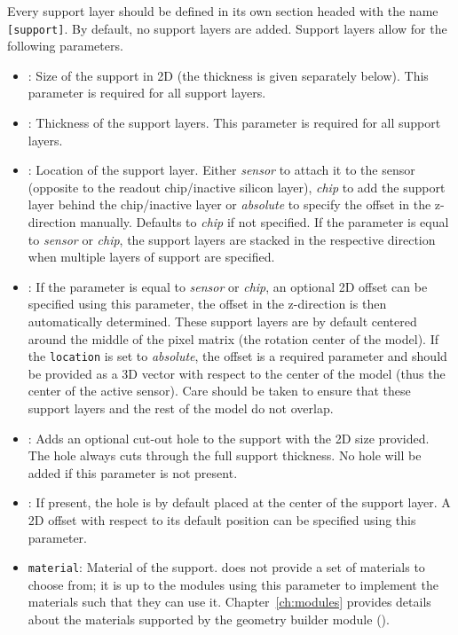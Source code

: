 Every support layer should be defined in its own section headed with the name \texttt{[support]}.
By default, no support layers are added.
Support layers allow for the following parameters.
\begin{itemize}
\item {}: Size of the support in 2D (the thickness is given separately below).
This parameter is required for all support layers.
\item {}: Thickness of the support layers.
This parameter is required for all support layers.
\item {}: Location of the support layer.
Either \textit{sensor} to attach it to the sensor (opposite to the readout chip/inactive silicon layer), \textit{chip} to add the support layer behind the chip/inactive layer or \textit{absolute} to specify the offset in the z-direction manually.
Defaults to \textit{chip} if not specified.
If the parameter is equal to \textit{sensor} or \textit{chip}, the support layers are stacked in the respective direction when multiple layers of support are specified.
\item {}: If the parameter  is equal to \textit{sensor} or \textit{chip}, an optional 2D offset can be specified using this parameter, the offset in the z-direction is then automatically determined.
These support layers are by default centered around the middle of the pixel matrix (the rotation center of the model).
If the \texttt{location} is set to \textit{absolute}, the offset is a required parameter and should be provided as a 3D vector with respect to the center of the model (thus the center of the active sensor).
Care should be taken to ensure that these support layers and the rest of the model do not overlap.
\item {}: Adds an optional cut-out hole to the support with the 2D size provided.
The hole always cuts through the full support thickness.
No hole will be added if this parameter is not present.
\item {}: If present, the hole is by default placed at the center of the support layer.
A 2D offset with respect to its default position can be specified using this parameter.
\item \texttt{material}: Material of the support. \apsq does not provide a set of materials to choose from; it is up to the modules using this parameter to implement the materials such that they can use it.
Chapter~\ref{ch:modules} provides details about the materials supported by the geometry builder module ().
\end{itemize}


